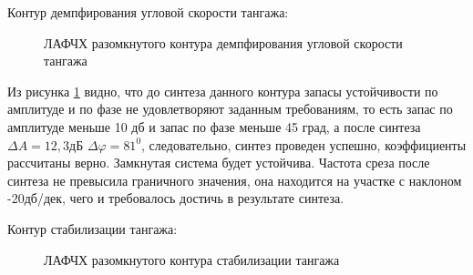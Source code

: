 
\begin{center}
    Контур демпфирования угловой скорости тангажа:
\end{center}

\begin{figure}[H]
    \caption{ЛАФЧХ разомкнутого контура демпфирования угловой скорости тангажа}
    \label{fig:Угловая скорость тангажа раз qKR}
\end{figure}

Из рисунка \ref{fig:Угловая скорость тангажа раз qKR} видно, что до синтеза данного контура запасы устойчивости по амплитуде и по фазе не удовлетворяют заданным требованиям, то есть запас по амплитуде меньше 10 дб и запас по фазе меньше 45 град, а после синтеза $\Delta A = 12,3 $дБ $\Delta \varphi = 81^0$, следовательно, синтез проведен успешно, коэффициенты рассчитаны верно. Замкнутая система будет устойчива. Частота среза после синтеза не превысила граничного значения, она находится на участке с наклоном -20дб/дек, чего и требовалось достичь в результате синтеза.  

\begin{center}
    Контур стабилизации тангажа:
\end{center}

\begin{figure}[H]
    \caption{ЛАФЧХ разомкнутого контура стабилизации тангажа}
    \label{fig:Тангаж раз qKR}
\end{figure}

